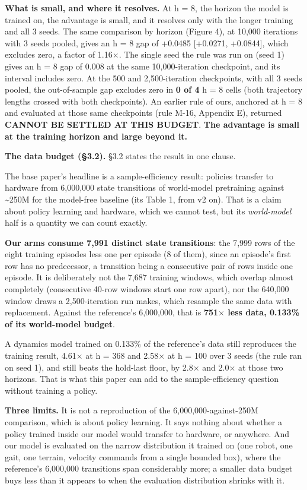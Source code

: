 \documentclass[10pt]{article}
\begin{document}
\textbf{What is small, and where it resolves.} At h = 8, the horizon the model is trained on, the advantage is small, and it resolves only with the longer training and all 3 seeds. The same comparison by horizon (Figure 4), at 10,000 iterations with 3 seeds pooled, gives an h = 8 gap of +0.0485 [+0.0271, +0.0844], which excludes zero, a factor of 1.16$\times$. The single seed the rule was run on (seed 1) gives an h = 8 gap of 0.008 at the same 10,000-iteration checkpoint, and its interval includes zero. At the 500 and 2,500-iteration checkpoints, with all 3 seeds pooled, the out-of-sample gap excludes zero in \textbf{0 of 4} h = 8 cells (both trajectory lengths crossed with both checkpoints). An earlier rule of ours, anchored at h = 8 and evaluated at those same checkpoints (rule M-16, Appendix E), returned \textbf{CANNOT BE SETTLED AT THIS BUDGET}. \textbf{The advantage is small at the training horizon and large beyond it.}

\textbf{The data budget (\S{}3.2).} \S{}3.2 states the result in one clause.

The base paper's headline is a sample-efficiency result: policies transfer to hardware from 6,000,000 state transitions of world-model pretraining against \textasciitilde{}250M for the model-free baseline (its Table 1, from v2 on). That is a claim about policy learning and hardware, which we cannot test, but its \emph{world-model} half is a quantity we can count exactly.

\textbf{Our arms consume 7,991 distinct state transitions}: the 7,999 rows of the eight training episodes less one per episode (8 of them), since an episode's first row has no predecessor, a transition being a consecutive pair of rows inside one episode. It is deliberately not the 7,687 training windows, which overlap almost completely (consecutive 40-row windows start one row apart), nor the 640,000 window draws a 2,500-iteration run makes, which resample the same data with replacement. Against the reference's 6,000,000, that is \textbf{751$\times$ less data, 0.133\% of its world-model budget}.

A dynamics model trained on 0.133\% of the reference's data still reproduces the training result, 4.61$\times$ at h = 368 and 2.58$\times$ at h = 100 over 3 seeds (the rule ran on seed 1), and still beats the hold-last floor, by 2.8$\times$ and 2.0$\times$ at those two horizons. That is what this paper can add to the sample-efficiency question without training a policy.

\textbf{Three limits.} It is not a reproduction of the 6,000,000-against-250M comparison, which is about policy learning. It says nothing about whether a policy trained inside our model would transfer to hardware, or anywhere. And our model is evaluated on the narrow distribution it trained on (one robot, one gait, one terrain, velocity commands from a single bounded box), where the reference's 6,000,000 transitions span considerably more; a smaller data budget buys less than it appears to when the evaluation distribution shrinks with it.
\end{document}
